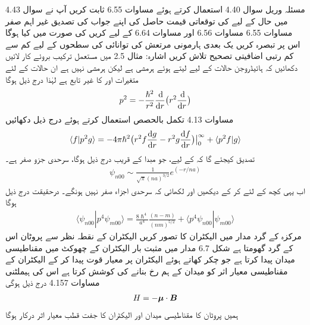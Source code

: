 مسئلہ وریل سوال 4.40 استعمال کرتے ہوئے مساوات 6.55 ثابت کریں 
آپ نے سوال 4.43 میں حال  کے لیے  کی توقعاتی قیمت حاصل کی اپنے جواب کی تصدیق  غیر اہم صفر  مساوات 6.55  مساوات 6.56 اور  مساوات 6.64 کے لیے کریں  کی صورت میں کیا ہوگا اس پر تبصرہ کریں 
 یک بعدی ہارمونی مرتعش کی توانائی کی سطحوں کے لیے کم سے کم رتبی اضافیتی تصحیح تلاش کریں اشارہ: مثال 2.5 میں مستعمل ترکیب بروئے کار لائیں 
دکھائیں کہ ہائیڈروجن حالات کے لیے  لیتے ہوئے  ہرمشی ہے لیکن  ہرمشی نہیں ہے ان حالات کے لئے  متغیرات  اور  کا غیر تابع ہے  لہٰذا   درج ذیل ہوگا 
\begin{align*}
p^2 = - \frac{\hslash^2}{r^2} \frac{\dif }{\dif r} \big ( r^2 \frac{\dif}{\dif r} \big )
\end{align*}
مساوات 4.13 تکمل بالحصص استعمال کرتے ہوئے درج ذیل دکھائیں 
\begin{align*}
\langle f | p^2 g \rangle = - 4 \pi \hslash^2 
\big ( r^2 f \frac{\dif g}{\dif r} - r^2 g \frac{\dif f}{\dif r} \big ) \big \rvert_0^{\infty} + \langle p^2 f | g \rangle 
\end{align*}
تصدیق کیجئے گا کہ  کے لیے، جو مبدا کے قریب درج ذیل ہوگا، سرحدی جزو صفر ہے۔
\begin{align*}
\psi_{n00} \sim \frac{1}{\sqrt{\pi} (na)^{3/2}} e^{(-r/na)}
\end{align*}
اب یہی کچھ  کے لئے کر کے دیکھیں اور لکھائی کہ سرحدی اجزاء صفر نہیں ہونگے۔  درحقیقت درج ذیل ہوگا 
\begin{align*}
\langle \psi_{n00} | p^4 \psi_{m00} \rangle = \frac{8\hslash^4}{a^4} \frac{(n - m)}{(nm)^{5/2}} + \langle p^4 \psi_{n00} | \psi_{m00} \rangle
\end{align*}
مرکزہ کے گرد مدار میں الیکٹران کا تصور کریں الیکٹران کے نقطہ نظر سے پروٹان اس کے گرد گھومتا ہے شکل 6.7 مدار میں مثبت بار الیکٹران کے چھوکٹ میں مقناطیسی میدان  پیدا کرتا ہے جو چکر کھاتے ہوئے الیکٹران پر معیار قوت پیدا کر کے الیکٹران کے مقناطیسی معیار اثر  کو میدان کے ہم رخ بنانے کی کوشش کرتا ہے اس کی ہیملٹنی مساوات 4.157 درج ذیل ہوگی 
\begin{align}
H = - {{\boldsymbol{\mu}}} \cdot {\ensuremath{{\boldsymbol{B}}}}
\end{align}
ہمیں پروٹان کا مقناطیسی میدان  اور الیکٹران کا جفت قطب معیار اثر  درکار ہوگا 

